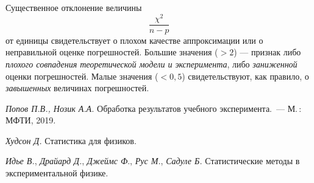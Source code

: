\begin{labsupplement}
\begin{description}[font=\mdseries\sffamily]
    Существенное отклонение величины 
    \[
     \frac{\chi^2}{n-p}
    \] 
    от единицы свидетельствует о плохом качестве аппроксимации или
    о неправильной оценке погрешностей.
    Большие значения ($>2$) --- признак либо \emph{плохого совпадения теоретической
    модели и эксперимента}, либо \emph{заниженной} оценки погрешностей.
    Малые значения ($<0,5$) свидетельствуют, как правило, о
    \emph{завышенных} величинах погрешностей.
    
\end{description}

\begin{lab:literature}
    \item \textit{Попов П.В., Нозик А.А.} Обработка результатов
    учебного эксперимента.~--- М.\,: МФТИ, 2019.

%    
%    
    
    \item \textit{Худсон Д.} Статистика для физиков.
    
    \item \textit{Идье В.}, \textit{Драйард Д.}, \textit{Джеймс Ф}., \textit{Рус М.}, \textit{Садуле Б.} 
    Статистические методы в экспериментальной физике.
\end{lab:literature}

\end{labsupplement}